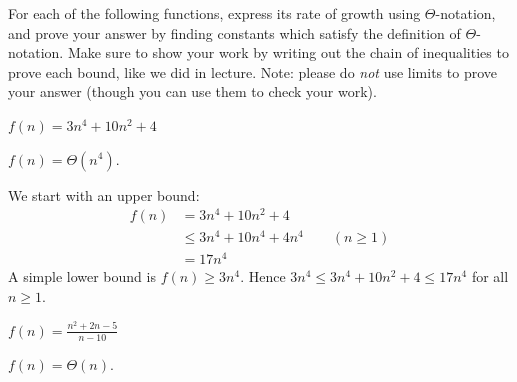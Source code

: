 \begin{prob}
    For each of the following functions, express its rate of growth using
    $\Theta$-notation, and prove your answer by finding constants which satisfy
    the definition of $\Theta$-notation. Make sure to show your work by writing
    out the chain of inequalities to prove each bound, like we did in lecture.
    Note: please do \emph{not} use limits to prove your answer (though you can
    use them to check your work).

    \begin{subprobset}
        \begin{subprob}
            $f(n) = 3n^4 + 10n^2 + 4$

            \begin{soln}
                $f(n) = \Theta(n^4)$.

                We start with an upper bound:
                \begin{align*}
                    f(n)
                    &=
                    3n^4 + 10n^2 + 4
                        \\
                    &\leq
                        3n^4 + 10n^4 + 4n^4 \qquad (n \geq 1)
                        \\
                    &=
                        17 n^4
                \end{align*}
                A simple lower bound is $f(n) \geq 3n^4$. Hence
                $3n^4 \leq 3n^4 + 10n^2 + 4 \leq 17n^4$ for all $n \geq 1$.
            \end{soln}

        \end{subprob}

        \begin{subprob}
            $
            \displaystyle
            f(n) =
            \frac{n^2 + 2n - 5}{n - 10}
            $

            \begin{soln}
                $f(n) = \Theta(n)$.


\end{soln}
\end{subprob}
\end{subprobset}
\end{prob}
